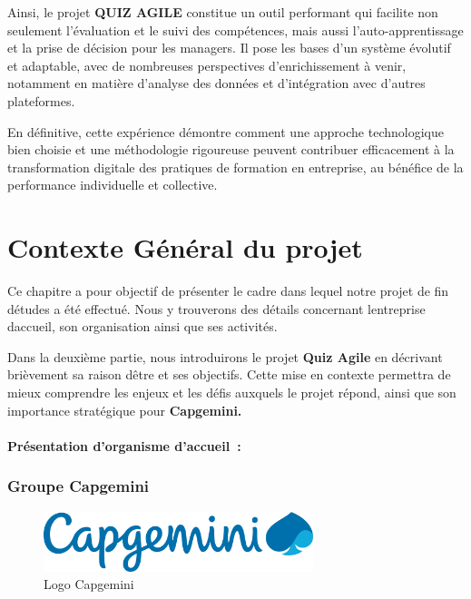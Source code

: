 \documentclass[12pt,a4paper,twoside]{report}
\begin{document}
Ainsi, le projet \textbf{QUIZ AGILE} constitue un outil performant qui
facilite non seulement l'évaluation et le suivi des compétences, mais
aussi l'auto-apprentissage et la prise de décision pour les managers. Il
pose les bases d'un système évolutif et adaptable, avec de nombreuses
perspectives d'enrichissement à venir, notamment en matière d'analyse
des données et d'intégration avec d'autres plateformes.

En définitive, cette expérience démontre comment une approche
technologique bien choisie et une méthodologie rigoureuse peuvent
contribuer efficacement à la transformation digitale des pratiques de
formation en entreprise, au bénéfice de la performance individuelle et
collective.

\chapter{Contexte Général du projet}

Ce chapitre a pour objectif de présenter le cadre dans lequel notre
projet de fin d\textquotesingle études a été effectué. Nous y trouverons
des détails concernant l\textquotesingle entreprise
d\textquotesingle accueil, son organisation ainsi que ses activités.

Dans la deuxième partie, nous introduirons le projet \textbf{Quiz Agile}
en décrivant brièvement sa raison d\textquotesingle être et ses
objectifs. Cette mise en contexte permettra de mieux comprendre les
enjeux et les défis auxquels le projet répond, ainsi que son importance
stratégique pour \textbf{Capgemini.}

\hypertarget{pruxe9sentation-dorganisme-daccueil}{%
\subsubsection{Présentation d'organisme
d'accueil~:}\label{pruxe9sentation-dorganisme-daccueil}}

\hypertarget{groupe-capgemini}{%
\subsection{Groupe Capgemini ~}\label{groupe-capgemini}}

\begin{figure}[htbp]
    \centering
    \includegraphics[width=0.7\textwidth]{latex_media/media/image3.png}
    \caption{Logo Capgemini}
    \label{fig:logo-capgemini}
\end{figure}
\end{document}
